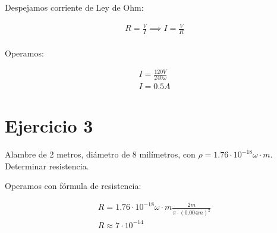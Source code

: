Despejamos corriente de Ley de Ohm:

\begin{align*}
    R = \frac{V}{I} \implies I = \frac{V}{R} \\
\end{align*}

Operamos:

\begin{align*}
    I = \frac{120 V}{240 \omega} \\
    \boxed{I = 0.5A}
\end{align*}

\section{Ejercicio 3}

Alambre de 2 metros, diámetro de 8 milímetros,
con \(\rho = 1.76 \cdot 10^{-18} \omega\cdot m\).
Determinar resistencia.

Operamos con fórmula de resistencia:

\begin{align*}
    R = 1.76 \cdot 10^{-18} \omega\cdot m \frac{2 m}{\pi\cdot (0.004 m)^2} \\
    \boxed{R \approx 7\cdot 10^{-14}}
\end{align*}

